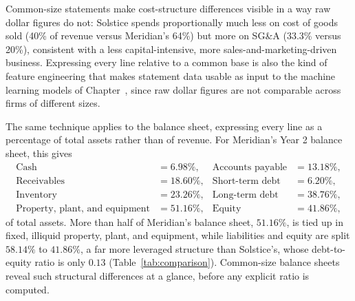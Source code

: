 \documentclass[../ai_in_finance]{subfiles}
\begin{document}
Common-size statements make cost-structure differences visible in a way raw dollar figures do not: Solstice spends proportionally much less on cost of goods sold (40\% of revenue versus Meridian's 64\%) but more on SG\&A (33.3\% versus 20\%), consistent with a less capital-intensive, more sales-and-marketing-driven business. Expressing every line relative to a common base is also the kind of feature engineering that makes statement data usable as input to the machine learning models of Chapter~, since raw dollar figures are not comparable across firms of different sizes.

The same technique applies to the balance sheet, expressing every line as a percentage of total assets rather than of revenue. For Meridian's Year 2 balance sheet, this gives
\begin{align*}
\text{Cash} &= 6.98\%, & \text{Accounts payable} &= 13.18\%, \\
\text{Receivables} &= 18.60\%, & \text{Short-term debt} &= 6.20\%, \\
\text{Inventory} &= 23.26\%, & \text{Long-term debt} &= 38.76\%, \\
\text{Property, plant, and equipment} &= 51.16\%, & \text{Equity} &= 41.86\%,
\end{align*}
of total assets. More than half of Meridian's balance sheet, $51.16\%$, is tied up in fixed, illiquid property, plant, and equipment, while liabilities and equity are split $58.14\%$ to $41.86\%$, a far more leveraged structure than Solstice's, whose debt-to-equity ratio is only $0.13$ (Table~\ref{tab:comparison}). Common-size balance sheets reveal such structural differences at a glance, before any explicit ratio is computed.
\end{document}

